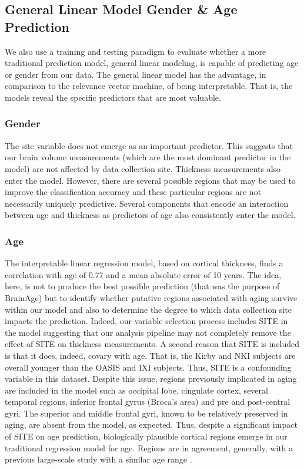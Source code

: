 \subsection{General Linear Model Gender \& Age Prediction} 
We also use a training and testing paradigm to evaluate whether a more
traditional prediction model, general linear modeling, is capable of
predicting age or gender from our data.  The general linear model has
the advantage, in comparison to the relevance vector machine, of being
interpretable.  That is, the models reveal the specific predictors
that are most valuable.  

\subsubsection{Gender} 
The site variable does not emerge as an important predictor.  This
suggests that our brain volume measurements (which are the most
dominant predictor in the model) are not affected by data collection
site.  Thickness measurements also enter the model.  However, there
are several possible regions that may be used to improve the
classification accuracy and these particular regions are not
necessarily uniquely predictive.  Several components that encode an
interaction between age and thickness as predictors of age also
consistently enter the model.  

\subsubsection{Age} 
The interpretable linear regression model, based on cortical
thickness, finds a correlation with age of 0.77 and a mean absolute
error of 10 years.  The idea, here, is not to produce the best
possible prediction (that was the purpose of BrainAge) but to identify
whether putative regions associated with aging survive within our
model and also to determine the degree to which data collection site
impacts the prediction.  Indeed, our variable selection process
includes SITE in the model suggesting that our analysis pipeline
may not completely remove the effect of SITE on thickness
measurements.  A second reason that SITE is included is that it does,
indeed, covary with age.  That is, the Kirby and NKI subjects are
overall younger than the OASIS and IXI subjects.  Thus, SITE is a
confounding variable in this dataset.  Despite this issue, regions
previously implicated in aging are included in the model such as
occipital lobe, cingulate cortex, several temporal regions, inferior
frontal gyrus (Broca's area) and pre and post-central gyri.  The
superior and middle frontal gyri, known to be relatively preserved in
aging, are absent from the model, as expected.  Thus, despite a
significant impact of SITE on age prediction, biologically plausible
cortical regions emerge in our traditional regression model for age.  
Regions are in agreement, generally, with a
previous large-scale study with a similar age range
\cite{groves2012}. 

